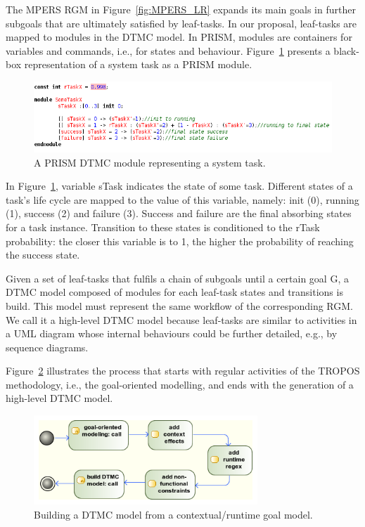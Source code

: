 The MPERS RGM in Figure~\ref{fig:MPERS_LR} expands its main goals in further subgoals that are ultimately satisfied by leaf-tasks. In our proposal, leaf-tasks are mapped to modules in the DTMC model. In PRISM, modules are containers for variables and commands, i.e., for states and behaviour. Figure~\ref{fig:PRISM_TASK_MODULE} presents a black-box representation of a system task as a PRISM module.

\begin{figure}[ht]
\centering
\includegraphics[width=1\textwidth]{imgs/PRISM_TASK_MODULE.png}
\caption{A PRISM DTMC module representing a system task.}
\label{fig:PRISM_TASK_MODULE}
\end{figure}

In Figure~\ref{fig:PRISM_TASK_MODULE}, variable sTask indicates the state of some task. Different states of a task's life cycle are mapped to the value of this variable, namely: init (0), running (1), success (2) and failure (3). Success and failure are the final absorbing states for a task instance. Transition to these states is conditioned to the rTask probability: the closer this variable is to 1, the higher the probability of reaching the success state. 

Given a set of leaf-tasks that fulfils a chain of subgoals until a certain goal G, a DTMC model composed of modules for each leaf-task states and transitions is build. This model must represent the same workflow of the corresponding RGM. We call it a high-level DTMC model because leaf-tasks are similar to activities in a UML diagram whose internal behaviours could be further detailed, e.g., by sequence diagrams. 

Figure~\ref{fig:CRGM_TO_DTMC} illustrates the process that starts with regular activities of the TROPOS methodology, i.e., the goal-oriented modelling, and ends with the generation of a high-level DTMC model.

\begin{figure}[ht]
\centering
\includegraphics[width=0.75\textwidth]{imgs/CRGM_TO_DTMC.png}
\caption{Building a DTMC model from a contextual/runtime goal model.}
\label{fig:CRGM_TO_DTMC}
\end{figure}

